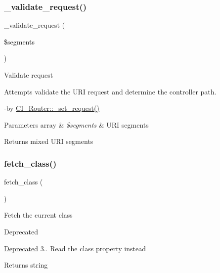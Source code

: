 \subsubsection{\texorpdfstring{\+\_\+validate\+\_\+request()}{\_validate\_request()}}
{\footnotesize\ttfamily \+\_\+validate\+\_\+request (\begin{DoxyParamCaption}\item[{}]{\$segments }\end{DoxyParamCaption})\hspace{0.3cm}{\ttfamily [protected]}}

Validate request

Attempts validate the U\+RI request and determine the controller path.

-\/by \mbox{\hyperlink{class_c_i___router_a92b8b486926e4dea5fee4d71f80a472a}{C\+I\+\_\+\+Router\+::\+\_\+set\+\_\+request()}} 
\begin{DoxyParams}[1]{Parameters}
array & {\em \$segments} & U\+RI segments \\
\hline
\end{DoxyParams}
\begin{DoxyReturn}{Returns}
mixed U\+RI segments 
\end{DoxyReturn}
\mbox{\label{class_c_i___router_af5586c3f514021e9e2588e102620d237}} 
\subsubsection{\texorpdfstring{fetch\+\_\+class()}{fetch\_class()}}
{\footnotesize\ttfamily fetch\+\_\+class (\begin{DoxyParamCaption}{ }\end{DoxyParamCaption})}

Fetch the current class

\begin{DoxyRefDesc}{Deprecated}
\item[\mbox{\hyperlink{deprecated__deprecated000003}{Deprecated}}]3.. Read the \textquotesingle{}class\textquotesingle{} property instead \end{DoxyRefDesc}
\begin{DoxyReturn}{Returns}
string 
\end{DoxyReturn}
\mbox{\label{class_c_i___router_a7a089f2cfae731dcc9e59a71d20208ef}} 
